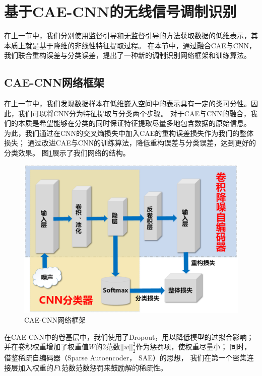 \section{基于CAE-CNN的无线信号调制识别}

在上一节中，我们分别使用监督引导和无监督引导的方法获取数据的低维表示，其本质上就是基于降维的非线性特征提取过程。
在本节中，通过融合CAE与CNN，我们联合重构误差与分类误差，提出了一种新的调制识别网络框架和训练算法。

\subsection{CAE-CNN网络框架}
在上一节中，我们发现数据样本在低维嵌入空间中的表示具有一定的类可分性。因此，我们可以将CNN分为特征提取与分类两个步骤。
对于CAE与CNN的融合，我们的本质是希望能够在分类的同时保证特征提取尽量多地包含数据的原始信息。
为此，我们通过在CNN的交叉熵损失中加入CAE的重构误差损失作为我们的整体损失；
通过改进CAE与CNN的训练算法，降低重构误差与分类误差，达到更好的分类效果。
图\ref{sec:fig_3_8}展示了我们网络的结构。

\begin{figure}[!h]
	\centering
	\includegraphics[scale=0.5]{figures/chapter_3/fig_3_8}
	\caption{CAE-CNN网络框架}	\label{sec:fig_3_8}
\end{figure}

在CAE-CNN中的卷基层中，我们使用了Dropout，用以降低模型的过拟合影响；
并在卷积权重增加了权重值$W$的2范数$||w||_2^2$作为惩罚项，使权重尽量小；
同时，借鉴稀疏自编码器（Sparse Autoencoder， SAE）的思想，
我们在第一个密集连接层加入权重的$F1$范数范数惩罚来鼓励解的稀疏性\cite{le2013building}。\par

